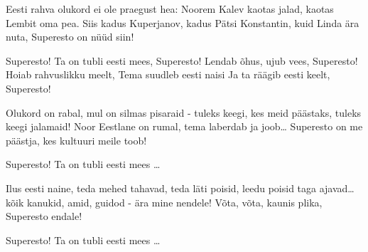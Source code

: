 Eesti rahva olukord ei ole praegust hea:
Noorem Kalev kaotas jalad, kaotas Lembit oma pea.
Siis kadus Kuperjanov, kadus P\"atsi Konstantin,
kuid Linda \"ara nuta, Superesto on n\"u\"ud siin!

Superesto! Ta on tubli eesti mees, 
Superesto! Lendab \~ohus, ujub vees,
Superesto! Hoiab rahvuslikku meelt,
Tema suudleb eesti naisi
Ja ta r\"a\"agib eesti keelt, Superesto!

Olukord on rabal, mul on silmas pisaraid -
tuleks keegi, kes meid p\"a\"astaks,
tuleks keegi jalamaid!
Noor Eestlane on rumal, tema laberdab ja joob\ldots
Superesto on me p\"a\"astja,
kes kultuuri meile toob!

Superesto! Ta on tubli eesti mees \ldots

Ilus eesti naine, teda mehed tahavad,
teda l\"ati poisid, leedu poisid taga ajavad\ldots
k\~oik kanukid, amid, guidod - \"ara mine nendele!
V\~ota, v\~ota, kaunis plika, Superesto endale!

Superesto! Ta on tubli eesti mees \ldots